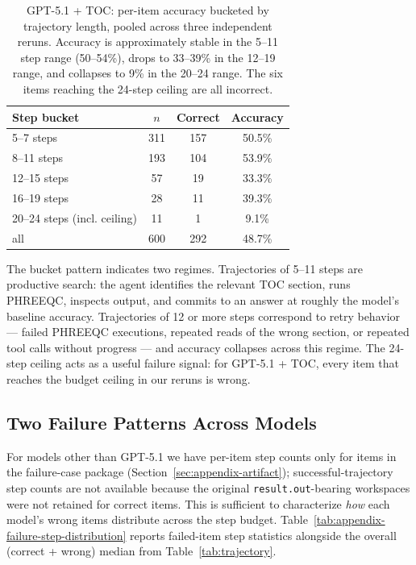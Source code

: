 \documentclass{article}
\begin{document}
\begin{table}[h]
\centering
\small
\setlength{\tabcolsep}{8pt}
\caption{GPT-5.1 + TOC: per-item accuracy bucketed by trajectory length, pooled across three independent reruns. Accuracy is approximately stable in the 5--11 step range (50--54\%), drops to 33--39\% in the 12--19 range, and collapses to 9\% in the 20--24 range. The six items reaching the 24-step ceiling are all incorrect.}
\label{tab:appendix-step-bucket}
\begin{tabular}{lccc}
\toprule
Step bucket & $n$ & Correct & Accuracy \\
\midrule
5--7 steps & 311 & 157 & 50.5\% \\
8--11 steps & 193 & 104 & 53.9\% \\
12--15 steps & 57 & 19 & 33.3\% \\
16--19 steps & 28 & 11 & 39.3\% \\
20--24 steps (incl. ceiling) & 11 & 1 & 9.1\% \\
\midrule
all & 600 & 292 & 48.7\% \\
\bottomrule
\end{tabular}
\end{table}

The bucket pattern indicates two regimes. Trajectories of 5--11 steps are productive search: the agent identifies the relevant TOC section, runs PHREEQC, inspects output, and commits to an answer at roughly the model's baseline accuracy. Trajectories of 12 or more steps correspond to retry behavior --- failed PHREEQC executions, repeated reads of the wrong section, or repeated tool calls without progress --- and accuracy collapses across this regime. The 24-step ceiling acts as a useful failure signal: for GPT-5.1 + TOC, every item that reaches the budget ceiling in our reruns is wrong.

\subsection{Two Failure Patterns Across Models}

For models other than GPT-5.1 we have per-item step counts only for items in the failure-case package (Section~\ref{sec:appendix-artifact}); successful-trajectory step counts are not available because the original \texttt{result.out}-bearing workspaces were not retained for correct items. This is sufficient to characterize \emph{how} each model's wrong items distribute across the step budget. Table~\ref{tab:appendix-failure-step-distribution} reports failed-item step statistics alongside the overall (correct + wrong) median from Table~\ref{tab:trajectory}.
\end{document}
